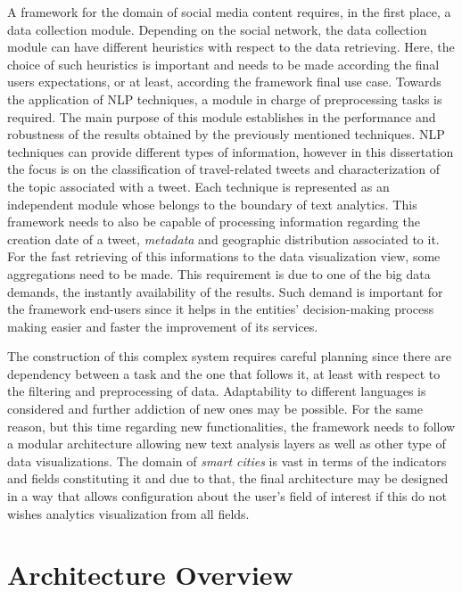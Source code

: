 A framework for the domain of social media content requires, in the first place, a data collection module. Depending on the social network, the data collection module can have different heuristics with respect to the data retrieving. Here, the choice of such heuristics is important and needs to be made according the final users expectations, or at least, according the framework final use case. Towards the application of NLP techniques, a module in charge of preprocessing tasks is required. The main purpose of this module establishes in the performance and robustness of the results obtained by the previously mentioned techniques. NLP techniques can provide different types of information, however in this dissertation the focus is on the classification of travel-related tweets and characterization of the topic associated with a tweet. Each technique is represented as an independent module whose belongs to the boundary of text analytics. This framework needs to also be capable of processing information regarding the creation date of a tweet, \textit{metadata} and geographic distribution associated to it. For the fast retrieving of this informations to the data visualization view, some aggregations need to be made. This requirement is due to one of the big data demands, the instantly availability of the results. Such demand is important for the framework end-users since it helps in the entities' decision-making process making easier and faster the improvement of its services.

The construction of this complex system requires careful planning since there are dependency between a task and the one that follows it, at least with respect to the filtering and preprocessing of data. Adaptability to different languages is considered and further addiction of new ones may be possible. For the same reason, but this time regarding new functionalities, the framework needs to follow a modular architecture allowing new text analysis layers as well as other type of data visualizations. The domain of \textit{smart cities} is vast in terms of the indicators and fields constituting it and due to that, the final architecture may be designed in a way that allows configuration about the user's field of interest if this do not wishes analytics visualization from all fields.

\section{Architecture Overview}\label{sec:architecture}

